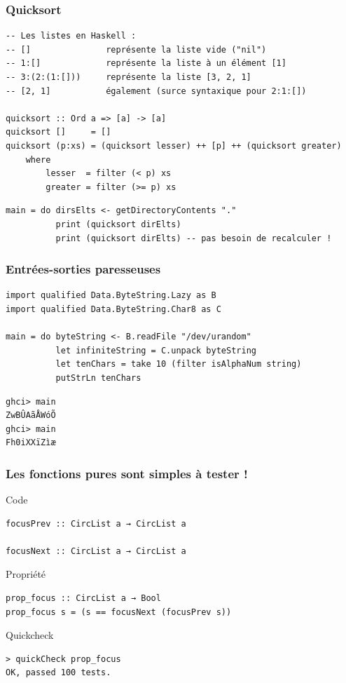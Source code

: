 \documentclass[10pt]{beamer}
\begin{document}
\begin{frame}[fragile]
\frametitle{Quicksort}

\begin{verbatim}
-- Les listes en Haskell :
-- []               représente la liste vide ("nil")
-- 1:[]             représente la liste à un élément [1]
-- 3:(2:(1:[]))     représente la liste [3, 2, 1]
-- [2, 1]           également (surce syntaxique pour 2:1:[])

quicksort :: Ord a => [a] -> [a]
quicksort []     = []
quicksort (p:xs) = (quicksort lesser) ++ [p] ++ (quicksort greater)
    where
        lesser  = filter (< p) xs
        greater = filter (>= p) xs
\end{verbatim}

\pause

\begin{verbatim}
main = do dirsElts <- getDirectoryContents "."
          print (quicksort dirElts)
          print (quicksort dirElts) -- pas besoin de recalculer !
\end{verbatim}

\end{frame}



\begin{frame}[fragile]
\frametitle{Entrées-sorties paresseuses}
\begin{verbatim}
import qualified Data.ByteString.Lazy as B
import qualified Data.ByteString.Char8 as C

main = do byteString <- B.readFile "/dev/urandom"
          let infiniteString = C.unpack byteString
          let tenChars = take 10 (filter isAlphaNum string)
          putStrLn tenChars
\end{verbatim}

\begin{verbatim}
ghci> main
ZwBÛAãÅWóÕ
ghci> main
Fh0iXXïZìæ
\end{verbatim}
\end{frame}



\begin{frame}[fragile]
\frametitle{Les fonctions pures sont simples à tester !}
\begin{block}{Code}
\begin{verbatim}
focusPrev :: CircList a → CircList a

focusNext :: CircList a → CircList a
\end{verbatim}
\end{block}
\pause
\begin{block}{Propriété}
\begin{verbatim}
prop_focus :: CircList a → Bool
prop_focus s = (s == focusNext (focusPrev s))
\end{verbatim}
\end{block}
\pause
\begin{block}{Quickcheck}
\begin{verbatim}
> quickCheck prop_focus
OK, passed 100 tests.
\end{verbatim}
\end{block}
\end{frame}
\end{document}
